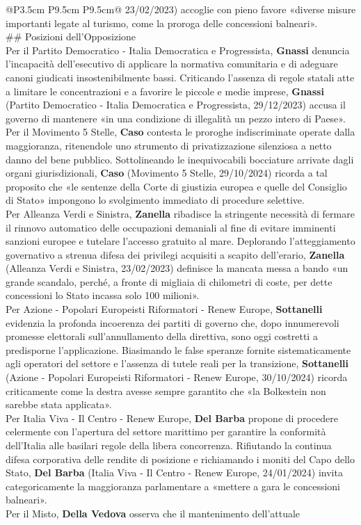 \documentclass[a4paper,11pt]{article}
\begin{document}
\begin{landscape}
\begin{longtable}{@{}P{3.5cm} P{9.5cm} P{9.5cm}@{}}
23/02/2023) accoglie con pieno favore «diverse misure importanti legate al turismo, come la proroga delle concessioni balneari».\\[6pt] \#\# Posizioni dell'Opposizione\\[6pt] Per il Partito Democratico - Italia Democratica e Progressista, \textbf{Gnassi} denuncia l'incapacità dell'esecutivo di applicare la normativa comunitaria e di adeguare canoni giudicati insostenibilmente bassi. Criticando l'assenza di regole statali atte a limitare le concentrazioni e a favorire le piccole e medie imprese, \textbf{Gnassi} (Partito Democratico - Italia Democratica e Progressista, 29/12/2023) accusa il governo di mantenere «in una condizione di illegalità un pezzo intero di Paese».\\[6pt] Per il Movimento 5 Stelle, \textbf{Caso} contesta le proroghe indiscriminate operate dalla maggioranza, ritenendole uno strumento di privatizzazione silenziosa a netto danno del bene pubblico. Sottolineando le inequivocabili bocciature arrivate dagli organi giurisdizionali, \textbf{Caso} (Movimento 5 Stelle, 29/10/2024) ricorda a tal proposito che «le sentenze della Corte di giustizia europea e quelle del Consiglio di Stato» impongono lo svolgimento immediato di procedure selettive.\\[6pt] Per Alleanza Verdi e Sinistra, \textbf{Zanella} ribadisce la stringente necessità di fermare il rinnovo automatico delle occupazioni demaniali al fine di evitare imminenti sanzioni europee e tutelare l'accesso gratuito al mare. Deplorando l'atteggiamento governativo a strenua difesa dei privilegi acquisiti a scapito dell'erario, \textbf{Zanella} (Alleanza Verdi e Sinistra, 23/02/2023) definisce la mancata messa a bando «un grande scandalo, perché, a fronte di migliaia di chilometri di coste, per dette concessioni lo Stato incassa solo 100 milioni».\\[6pt] Per Azione - Popolari Europeisti Riformatori - Renew Europe, \textbf{Sottanelli} evidenzia la profonda incoerenza dei partiti di governo che, dopo innumerevoli promesse elettorali sull'annullamento della direttiva, sono oggi costretti a predisporne l'applicazione. Biasimando le false speranze fornite sistematicamente agli operatori del settore e l'assenza di tutele reali per la transizione, \textbf{Sottanelli} (Azione - Popolari Europeisti Riformatori - Renew Europe, 30/10/2024) ricorda criticamente come la destra avesse sempre garantito che «la Bolkestein non sarebbe stata applicata».\\[6pt] Per Italia Viva - Il Centro - Renew Europe, \textbf{Del Barba} propone di procedere celermente con l'apertura del settore marittimo per garantire la conformità dell'Italia alle basilari regole della libera concorrenza. Rifiutando la continua difesa corporativa delle rendite di posizione e richiamando i moniti del Capo dello Stato, \textbf{Del Barba} (Italia Viva - Il Centro - Renew Europe, 24/01/2024) invita categoricamente la maggioranza parlamentare a «mettere a gara le concessioni balneari».\\[6pt] Per il Misto, \textbf{Della Vedova} osserva che il mantenimento dell'attuale 
\end{longtable}
\end{landscape}
\end{document}
